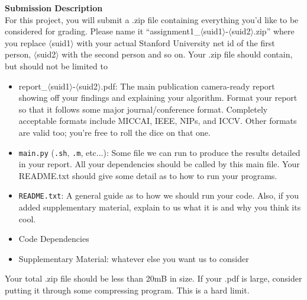 \documentclass[10pt]{article}
\begin{document}
\noindent \Large \textbf{Submission Description} \normalsize \\
\noindent\makebox[\linewidth]{\rule{\textwidth}{0.4pt}}
\indent For this project, you will submit a .zip file containing everything you'd like to be considered for grading.  Please name it ``assignment1\_$\langle$suid1$\rangle$-$\langle$suid2$\rangle$.zip'' where you replace $\langle$suid1$\rangle$ with your actual Stanford University net id of the first person, $\langle$suid2$\rangle$ with the second person and so on.  Your .zip file should contain, but should not be limited to
\begin{itemize}[topsep=0pt,itemsep=-1ex,partopsep=1ex,parsep=1ex]
\item report\_$\langle$suid1$\rangle$-$\langle$suid2$\rangle$.pdf: The main publication camera-ready report showing off your findings and explaining your algorithm.  Format your report so that it follows some major journal/conference format.  Completely acceptable formats include MICCAI, IEEE, NIPs, and ICCV.  Other formats are valid too; you're free to roll the dice on that one.
\item \texttt{main.py} (\texttt{.sh}, \texttt{.m}, etc...): Some file we can run to produce the results detailed in your report.  All your dependencies should be called by this main file.  Your README.txt should give some detail as to how to run your programs.
\item \texttt{README.txt}: A general guide as to how we should run your code.  Also, if you added supplementary material, explain to us what it is and why you think its cool.
\item Code Dependencies
\item Supplementary Material: whatever else you want us to consider
\end{itemize}
Your total .zip file should be less than 20mB in size.  If your .pdf is large, consider putting it through some compressing program.  This is a hard limit.\\
\end{document}
